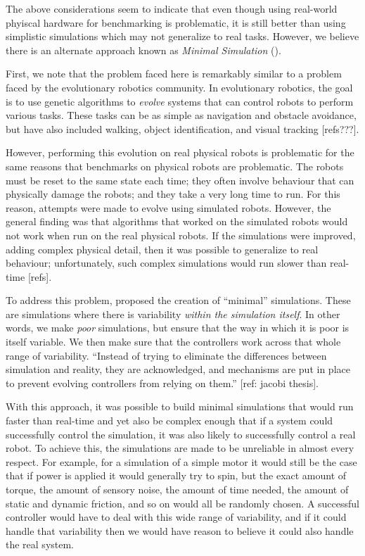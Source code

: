 \documentclass{frontiersSCNS} %
\begin{document}
The above considerations seem to indicate that even though using real-world
phyiscal hardware for benchmarking is problematic, it is still better than
using simplistic simulations which may not generalize to real tasks.  However,
we believe there is an alternate approach known as \emph{Minimal Simulation}
(\citealt{Jakobi97evolutionaryrobotics}).

First, we note that the problem faced here is remarkably similar to a problem
faced by the evolutionary robotics community.  In evolutionary robotics, the
goal is to use genetic algorithms to \emph{evolve} systems that can control
robots to perform various tasks.  These tasks can be as simple as navigation
and obstacle avoidance, but have also included walking,
object identification, and visual tracking [refs???].

However, performing this evolution on real physical robots is problematic
for the same reasons that benchmarks on physical robots are problematic.  The
robots must be reset to the same state each time; they often involve
behaviour that can physically damage the robots; and they take a very long
time to run.  For this reason, attempts were made to evolve using simulated
robots.  However, the general finding was that algorithms that worked on the
simulated robots would not work when run on the real physical robots.  If
the simulations were improved, adding complex physical detail, then it was
possible to generalize to real behaviour; unfortunately, such complex
simulations would run slower than real-time [refs].

To address this problem, \cite{Jakobi97evolutionaryrobotics} proposed the creation of
``minimal'' simulations.  These are simulations where there is variability
\emph{within the simulation itself}.  In other words, we make \emph{poor}
simulations, but ensure that the way in which it is poor is itself
variable.  We then make sure that the controllers work across that whole
range of variability.  ``Instead of trying to eliminate the differences between
simulation and reality, they are acknowledged, and mechanisms are put in place
to prevent evolving controllers from relying on them.'' [ref: jacobi thesis].

With this approach, it was possible to build minimal simulations that would
run faster than real-time and yet also be complex enough that if a system
could successfully control the simulation, it was also likely to successfully
control a real robot.  To achieve this, the simulations are made to be
unreliable in almost every respect.  For example, for a simulation of a simple
motor it would still be the case that if power is applied it would generally
try to spin, but the exact amount of torque, the amount of sensory noise,
the amount of time needed, the amount of static and dynamic friction, and so
on would all be randomly chosen.  A successful controller would have to deal
with this wide range of variability, and if it could handle that variability
then we would have reason to believe it could also handle the real system.
\end{document}
